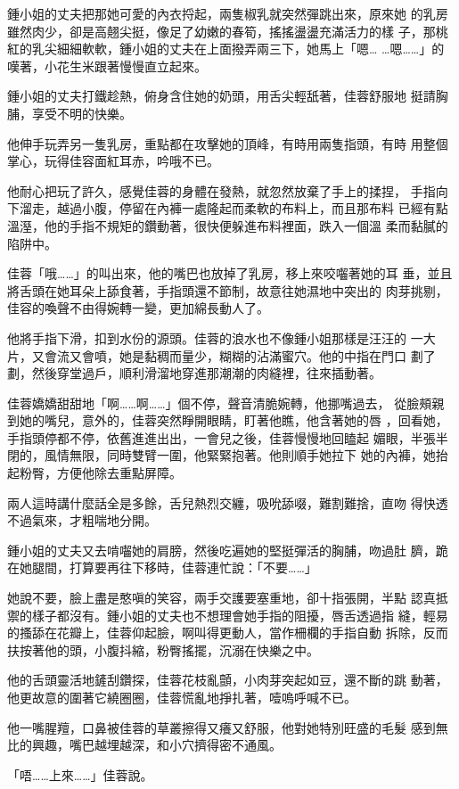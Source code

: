 鍾小姐的丈夫把那她可愛的內衣捋起，兩隻椒乳就突然彈跳出來，原來她
的乳房雖然肉少，卻是高翹尖挺，像足了幼嫩的春筍，搖搖盪盪充滿活力的樣
子，那桃紅的乳尖細細軟軟，鍾小姐的丈夫在上面撥弄兩三下，她馬上「嗯…
…嗯……」的嘆著，小花生米跟著慢慢直立起來。

鍾小姐的丈夫打鐵趁熱，俯身含住她的奶頭，用舌尖輕舐著，佳蓉舒服地
挺請胸脯，享受不明的快樂。

他伸手玩弄另一隻乳房，重點都在攻擊她的頂峰，有時用兩隻指頭，有時
用整個掌心，玩得佳容面紅耳赤，吟哦不已。

他耐心把玩了許久，感覺佳蓉的身體在發熱，就忽然放棄了手上的揉捏，
手指向下溜走，越過小腹，停留在內褲一處隆起而柔軟的布料上，而且那布料
已經有點溫溼，他的手指不規矩的鑽動著，很快便躲進布料裡面，跌入一個溫
柔而黏膩的陷阱中。

佳蓉「哦……」的叫出來，他的嘴巴也放掉了乳房，移上來咬囓著她的耳
垂，並且將舌頭在她耳朵上舔食著，手指頭還不節制，故意往她濕地中突出的
肉芽挑剔，佳容的喚聲不由得婉轉一變，更加綿長動人了。

他將手指下滑，扣到水份的源頭。佳蓉的浪水也不像鍾小姐那樣是汪汪的
一大片，又會流又會噴，她是黏稠而量少，糊糊的沾滿蜜穴。他的中指在門口
劃了劃，然後穿堂過戶，順利滑溜地穿進那潮潮的肉縫裡，往來插動著。

佳蓉嬌嬌甜甜地「啊……啊……」個不停，聲音清脆婉轉，他挪嘴過去，
從臉頰親到她的嘴兒，意外的，佳蓉突然睜開眼睛，盯著他瞧，他含著她的唇
，回看她，手指頭停都不停，依舊進進出出，一會兒之後，佳蓉慢慢地回瞌起
媚眼，半張半閉的，風情無限，同時雙臂一圍，他緊緊抱著。他則順手她拉下
她的內褲，她抬起粉臀，方便他除去重點屏障。

兩人這時講什麼話全是多餘，舌兒熱烈交纏，吸吮舔啜，難割難捨，直吻
得快透不過氣來，才粗喘地分開。

鍾小姐的丈夫又去啃囓她的肩膀，然後吃遍她的堅挺彈活的胸脯，吻過肚
臍，跪在她腿間，打算要再往下移時，佳蓉連忙說：「不要……」

她說不要，臉上盡是憨嗔的笑容，兩手交護要塞重地，卻十指張開，半點
認真抵禦的樣子都沒有。鍾小姐的丈夫也不想理會她手指的阻擾，唇舌透過指
縫，輕易的搔舔在花瓣上，佳蓉仰起臉，啊叫得更動人，當作柵欄的手指自動
拆除，反而扶按著他的頭，小腹抖縮，粉臀搖擺，沉溺在快樂之中。

他的舌頭靈活地鏟刮鑽探，佳蓉花枝亂顫，小肉芽突起如豆，還不斷的跳
動著，他更故意的圍著它繞圈圈，佳蓉慌亂地掙扎著，噎嗚呼喊不已。

他一嘴腥羶，口鼻被佳蓉的草叢擦得又癢又舒服，他對她特別旺盛的毛髮
感到無比的興趣，嘴巴越埋越深，和小穴擠得密不通風。

「唔……上來……」佳蓉說。

